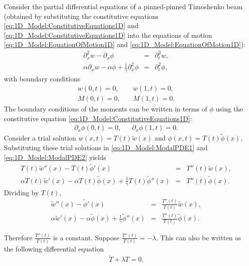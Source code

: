 \documentclass[../../main.tex]{subfiles}
\begin{document}
Consider the partial differential equations of a pinned-pinned Timoshenko beam (obtained by substituting the constitutive equations \eqref{eq:1D_Model:ConstitutiveEquations1D} and \eqref{eq:1D_Model:ConstitutiveEquations1D} into the equations of motion \eqref{eq:1D_Model:EquationOfMotion1D} and \eqref{eq:1D_Model:EquationOfMotion1D}):
\begin{eqnarray}
	  \partial^2_{x} w - \partial_{x}\phi &=& \partial^{2}_{t} w, \label{eq:1D_Model:ModalPDE1}\\
	  \alpha\partial_{x} w - \alpha\phi + \frac{1}{\gamma}\partial^2_{x}\phi &=&  \partial^{2}_{t} \phi,\label{eq:1D_Model:ModalPDE2}
\end{eqnarray}
with boundary conditions
\begin{eqnarray*}
	w(0,t) = 0, & &	\	 w(1,t) = 0, \label{eq:1D_Model:ModalBC1}\\
	M(0,t) = 0, & &	\	M(1,t) = 0. \label{eq:1D_Model:ModalBC2}
\end{eqnarray*}
The boundary conditions of the moments can be written in terms of $\phi$ using the constitutive equation \eqref{eq:1D_Model:ConstitutiveEquations1D}:
\begin{eqnarray*}
	\partial_{x}\phi(0,t) = 0, & & \partial_{x}\phi(1,t) = 0. \label{MA_4}
\end{eqnarray*}
Consider a trial solution $w(x,t) = T(t)\tilde{w}(x)$ and $\phi(x,t) = T(t)\tilde{\phi}(x)$. Substituting these trial solutions in \eqref{eq:1D_Model:ModalPDE1} and \eqref{eq:1D_Model:ModalPDE2} yields
\begin{eqnarray*}
	T(t)\tilde{w}''(x) - T(t)\tilde{\phi}'(x) &=& T''(t)\tilde{w}(x),\\
	  \alpha T(t)\tilde{w}'(x) - \alpha T(t)\tilde{\phi}(x) + \frac{1}{\gamma}T(t)\tilde{\phi}''(x) &=&  T''(t)\tilde{\phi}(x).
\end{eqnarray*}
Dividing by $T(t)$,
\begin{eqnarray*}
	\tilde{w}''(x) - \tilde{\phi}'(x) &=& \frac{T''(t)}{T(t)}\tilde{w}(x),\\
	  \alpha \tilde{w}'(x) - \alpha \tilde{\phi}(x) + \frac{1}{\gamma}\tilde{\phi}''(x) &=&  \frac{T''(t)}{T(t)}\tilde{\phi}(x).
\end{eqnarray*}

Therefore $\displaystyle \frac{T''(t)}{T(t)}$ is a constant. Suppose $\displaystyle \frac{T''(t)}{T(t)} = -\lambda$. This can also be written as the following differential equation
\begin{eqnarray}
	\ddot{T} + \lambda T = 0. \label{eq:1D_Model:ModalAnalysisT}
\end{eqnarray}
\end{document}
